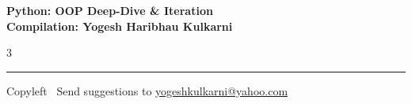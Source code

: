 \documentclass[8pt,landscape]{article}
\begin{document}
\footnotesize


\begin{center}
\Large{\textbf{Python: OOP Deep-Dive \& Iteration\\ Compilation: Yogesh Haribhau Kulkarni}}
\end{center}

\begin{multicols}{3}

\end{multicols}

\rule{\linewidth}{0.25pt}
\scriptsize
Copyleft \textcopyleft\  Send suggestions to
\href{http://www.yogeshkulkarni.com}{yogeshkulkarni@yahoo.com}
\end{document}
